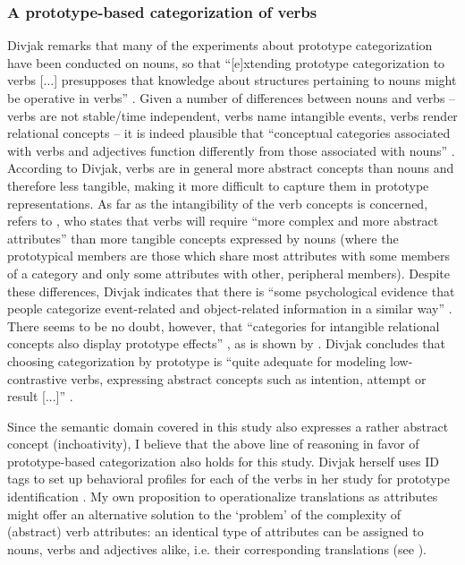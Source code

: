 \subsubsection{A prototype-based categorization of verbs}
\label{sec:2.4.3.2} 
Divjak remarks that many of the experiments about prototype categorization have been conducted on nouns, so that “[e]xtending prototype categorization to verbs [...] presupposes that knowledge about structures pertaining to nouns might be operative in verbs” \citep[150]{divjak_structuring_2010}. Given a number of differences between nouns and verbs – verbs are not stable/time independent, verbs name intangible events, verbs render relational concepts \citep{divjak_structuring_2010} – it is indeed plausible that “conceptual categories associated with verbs and adjectives function differently from those associated with nouns” \citep{divjak_structuring_2010}. According to Divjak, verbs are in general more abstract concepts than nouns and therefore less tangible, making it more difficult to capture them in prototype representations. As far as the intangibility of the verb concepts is concerned, \citet[152]{divjak_structuring_2010} refers to \citet[114]{pulman_word_1983}, who states that verbs will require “more complex and more abstract attributes” than more tangible concepts expressed by nouns (where the prototypical members are those which share most attributes with some members of a category and only some attributes with other, peripheral members). Despite these differences, Divjak indicates that there is “some psychological evidence that people categorize event-related and object-related information in a similar way” \citep[151]{divjak_structuring_2010}. There seems to be no doubt, however, that “categories for intangible relational concepts also display prototype effects” \citep[153]{divjak_structuring_2010}, as is shown by \citet{schmid_cottage_1993,taylor_linguistic_1995,taylor_linguistic_2003,geeraerts_preponderantieverschillen_1985, rudzka-ostyn_where_1988, geeraerts_homonymy_1990} \citep[153]{all cited by divjak_structuring_2010}. Divjak concludes that choosing categorization by prototype is “quite adequate for modeling low-contrastive verbs, expressing abstract concepts such as intention, attempt or result [...]” \citep[150]{divjak_structuring_2010}.

Since the semantic domain covered in this study also expresses a rather abstract concept (inchoativity), I believe that the above line of reasoning in favor of prototype-based categorization also holds for this study. Divjak herself uses ID tags to set up behavioral profiles for each of the verbs in her study for prototype identification \citep[158]{divjak_structuring_2010}. My own proposition to operationalize translations as attributes might offer an alternative solution to the ‘problem’ of the complexity of (abstract) verb attributes: an identical type of attributes can be assigned to nouns, verbs and adjectives alike, i.e. their corresponding translations (see ).

